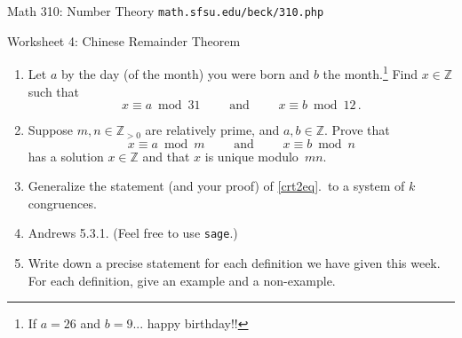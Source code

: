 \documentclass[11pt]{article}
\def\Z{\mathbb{Z}}
\def\sage{{\tt sage}}
\begin{document}
\setlength{\parindent}{0pt}
\setlength{\parskip}{0.2cm}

{ Math 310: Number Theory}
\hfill
{\tt math.sfsu.edu/beck/310.php}

\vspace{.3in}

\begin{center}
\Large{Worksheet 4: Chinese Remainder Theorem}
\end{center}

\begin{enumerate}

\item Let $a$ by the day (of the month) you were born and $b$ the month.\footnote{
If $a = 26$ and $b = 9$... happy birthday!!
}
Find $x \in \Z$ such that
\[
  x \equiv a \bmod 31
  \qquad \text{ and } \qquad
  x \equiv b \bmod 12 \, .
\]

\item\label{crt2eq}
Suppose $m, n \in \Z_{ >0 }$ are relatively prime, and $a, b \in \Z$.
Prove that
\[
  x \equiv a \bmod m
  \qquad \text{ and } \qquad
  x \equiv b \bmod n 
\]
has a solution $x \in \Z$ and that $x$ is unique modulo~$mn$.

\item Generalize the statement (and your proof) of \ref{crt2eq}.\ to a system of $k$ congruences.

\item Andrews 5.3.1. (Feel free to use \sage.)

\item Write down a precise statement for each definition we have given this week.
For each definition, give an example and a non-example.

\end{enumerate}
\end{document}
